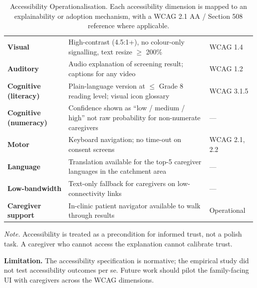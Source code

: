 {\tablestripes\tablefontsize
{}
\begin{xltabular}{\textwidth}{@{} >{\raggedright\arraybackslash}p{3.9cm} p{9.0cm} >{\centering\arraybackslash}p{1.5cm} @{}}
\caption[Accessibility Operationalisation]{Accessibility Operationalisation. Each accessibility dimension is mapped to an explainability or adoption mechanism, with a WCAG 2.1 AA / Section 508 reference where applicable.}\label{tab:appj_accessibility} \\
\toprule
{} &  &  \\
\midrule
\endfirsthead
\endhead
\bottomrule
\endlastfoot
\textbf{Visual}          & High-contrast (4.5:1+), no colour-only signalling, text resize $\geq$ 200\% & WCAG 1.4 \\
\textbf{Auditory}        & Audio explanation of screening result; captions for any video    & WCAG 1.2 \\
\textbf{Cognitive (literacy)} & Plain-language version at $\leq$ Grade 8 reading level; visual icon glossary & WCAG 3.1.5 \\
\textbf{Cognitive (numeracy)} & Confidence shown as ``low / medium / high'' not raw probability for non-numerate caregivers & --- \\
\textbf{Motor}           & Keyboard navigation; no time-out on consent screens                  & WCAG 2.1, 2.2 \\
\textbf{Language}        & Translation available for the top-5 caregiver languages in the catchment area & --- \\
\textbf{Low-bandwidth}   & Text-only fallback for caregivers on low-connectivity links          & --- \\
\textbf{Caregiver support} & In-clinic patient navigator available to walk through results        & Operational \\
\end{xltabular}}
\vspace{0.4em}
\noindent\textit{Note.} Accessibility is treated as a precondition for informed trust, not a polish task. A caregiver who cannot access the explanation cannot calibrate trust.

\noindent\textbf{Limitation.} The accessibility specification is normative; the empirical study did not test accessibility outcomes per se. Future work should pilot the family-facing UI with caregivers across the WCAG dimensions.

